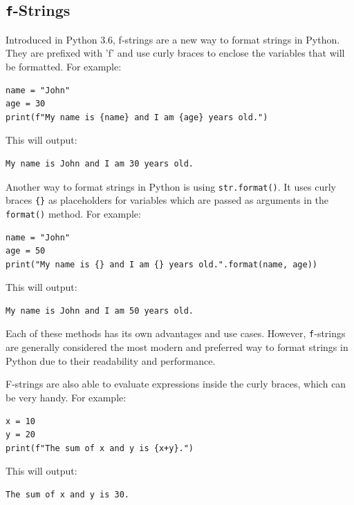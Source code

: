 \documentclass[../../data_analysis_python.tex]{subfiles}
\begin{document}
    \subsection{\lstinline|f|-Strings}

    Introduced in Python 3.6, f-strings are a new way to format strings in Python. They are prefixed with 'f' and use curly braces {} to enclose the variables that will be formatted. For example:

    \begin{lstlisting}
name = "John"
age = 30
print(f"My name is {name} and I am {age} years old.")
    \end{lstlisting}

    This will output:

    \begin{lstlisting}
My name is John and I am 30 years old.
    \end{lstlisting}

    Another way to format strings in Python is using \lstinline|str.format()|. It uses curly braces \lstinline|{}| as placeholders for variables which are passed as arguments in the \lstinline|format()| method. For example:

    \begin{lstlisting}
name = "John"
age = 50
print("My name is {} and I am {} years old.".format(name, age))
    \end{lstlisting}

    This will output:

    \begin{lstlisting}[caption={caption},label=DescriptiveLabel]
My name is John and I am 50 years old.
    \end{lstlisting}

    \begin{obs}
        Each of these methods has its own advantages and use cases. However, \lstinline|f|-strings are generally considered the most modern and preferred way to format strings in Python due to their readability and performance.
    \end{obs}

    \begin{idea}
        F-strings are also able to evaluate expressions inside the curly braces, which can be very handy. For example:
        \begin{lstlisting}
x = 10
y = 20
print(f"The sum of x and y is {x+y}.")
        \end{lstlisting}

        This will output:
        \begin{lstlisting}
The sum of x and y is 30.
        \end{lstlisting}
    \end{idea}
\end{document}

